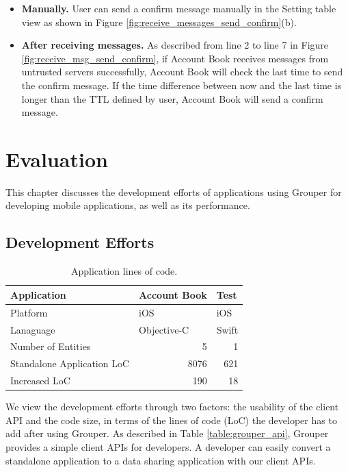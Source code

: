\documentclass[a4paper,11pt]{report}
\begin{document}
\begin{itemize}[leftmargin=7mm]
	\setlength{\itemsep}{1pt}
	\setlength{\parskip}{0pt}
	\setlength{\parsep}{0pt}
	\item \textbf{Manually.}
	User can send a confirm message manually in the Setting table view as shown in Figure \ref{fig:receive_messages_send_confirm}(b).
	\item \textbf{After receiving messages.}
	As described from line 2 to line 7 in Figure \ref{fig:receive_msg_send_confirm}, if Account Book receives messages from untrusted servers successfully, Account Book will check the last time to send the confirm message.
	If the time difference between now and the last time is longer than the TTL defined by user, Account Book will send a confirm message.

\end{itemize}

\chapter{Evaluation} \label{chapter:evaluation}

This chapter discusses the development efforts of applications using Grouper for developing mobile applications, as well as its performance.

\section{Development Efforts} \label{section:development_efforts}

\begin{table}
	\centering
	\begin{tabular}{lll}
		\toprule
		\textbf{Application} & \textbf{Account Book} & \textbf{Test} \\ 
		\midrule
		Platform & iOS & iOS \\ 
		Lanaguage & Objective-C & Swift \\ 
		Number of Entities & \multicolumn{1}{r}{5} & \multicolumn{1}{r}{1} \\ 
		Standalone Application LoC & \multicolumn{1}{r}{8076} & \multicolumn{1}{r}{621} \\ 
		Increased LoC &  \multicolumn{1}{r}{190} &  \multicolumn{1}{r}{18} \\ 
		\bottomrule
	\end{tabular}
	\caption{Application lines of code.}
	\label{table:loc}
\end{table}

We view the development efforts through two factors: the usability of the client API and the code size, in terms of the lines of code (LoC) the developer has to add after using Grouper. 
As described in Table \ref{table:grouper_api}, Grouper provides a simple client APIs for developers.
A developer can easily convert a standalone application to a data sharing application with our client APIs.
\end{document}

